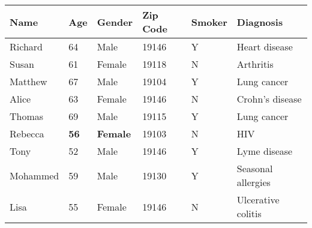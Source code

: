 \begin{tabular}{llllll}
    \toprule
    \textbf{Name} & \textbf{Age} & \textbf{Gender} & \textbf{Zip Code} & \textbf{Smoker} & \textbf{Diagnosis} \\ \midrule
    Richard & 64 & Male & 19146 & Y & Heart disease \\ 
    Susan & 61 & Female & 19118 & N & Arthritis \\ 
    Matthew & 67 & Male & 19104 & Y & Lung cancer \\ 
    Alice & 63 & Female & 19146 & N & Crohn's disease \\ 
    Thomas & 69 & Male & 19115 & Y & Lung cancer \\ 
    Rebecca & \textbf{56} & \textbf{Female} & 19103 & N & HIV \\ 
    Tony & 52 & Male & 19146 & Y & Lyme disease \\ 
    Mohammed & 59 & Male & 19130 & Y & Seasonal allergies \\ 
    Lisa & 55 & Female & 19146 & N & Ulcerative colitis \\ \bottomrule
\end{tabular}

